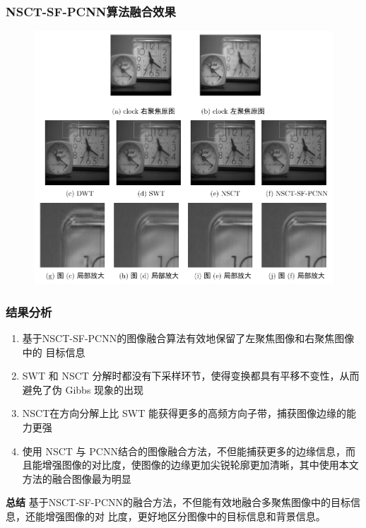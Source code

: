 \documentclass[10pt,aspectratio=43,mathserif]{beamer}
\begin{document}
\begin{frame}
		  \frametitle{\textbf{NSCT-SF-PCNN算法融合效果}}
\begin{figure}[ht] %
	\centering
	\includegraphics[width=0.8\linewidth]{./figures/pcnn/total.png} %
\end{figure}
		\end{frame}

\begin{frame}
		  \frametitle{\textbf{结果分析}}

\begin{enumerate}
\item 基于NSCT-SF-PCNN的图像融合算法有效地保留了左聚焦图像和右聚焦图像中的
目标信息
\item SWT 和 NSCT 分解时都没有下采样环节，使得变换都具有平移不变性，从而避免了伪 Gibbs 现象的出现
\item NSCT在方向分解上比 SWT 能获得更多的高频方向子带，捕获图像边缘的能力更强
\item 使用 NSCT 与 PCNN结合的图像融合方法，不但能捕获更多的边缘信息，而且能增强图像的对比度，使图像的边缘更加尖锐轮廓更加清晰，其中使用本文方法的融合图像最为明显
\end{enumerate}
\begin{block}{\textbf{总结}}
                基于NSCT-SF-PCNN的融合方法，不但能有效地融合多聚焦图像中的目标信息，还能增强图像的对
比度，更好地区分图像中的目标信息和背景信息。
            \end{block}
		\end{frame}
\end{document}
